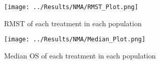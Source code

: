 \begin{figure}[h]
    \centering
    \texttt{[image: ../Results/NMA/RMST\_Plot.png]}
    \caption{RMST of each treatment in each population}
    \label{fig:pred_rmst}
\end{figure}

\begin{figure}[h]
    \centering
    \texttt{[image: ../Results/NMA/Median\_Plot.png]}
    \caption{Median OS of each treatment in each population}
    \label{fig:pred_median}
\end{figure}